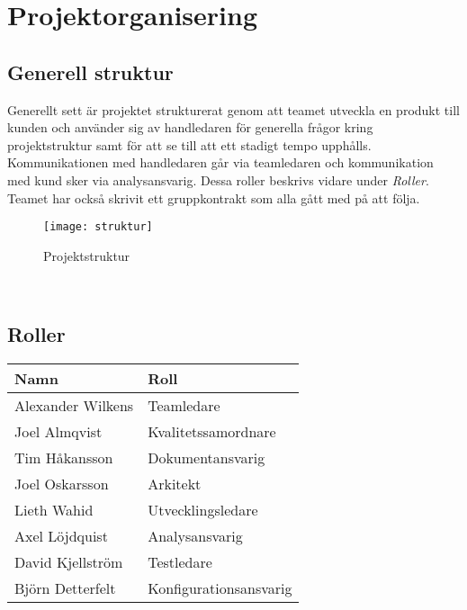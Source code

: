 \section{Projektorganisering}
\subsection{Generell struktur}
Generellt sett är projektet strukturerat genom att teamet utveckla en produkt till kunden och använder sig av
handledaren för generella frågor kring projektstruktur samt för att se till att ett stadigt tempo upphålls.
Kommunikationen med handledaren går via teamledaren och kommunikation med kund sker via analysansvarig. Dessa roller
beskrivs vidare under \textit{Roller}. Teamet har också skrivit ett gruppkontrakt\cite{bib-gruppkontrakt} som alla gått med på att följa.
\begin{figure}[t]
    \centering
    \texttt{[image: struktur]}
    \caption{Projektstruktur}
    \label{fig:struktur}
\end{figure}\\



\subsection{Roller}
\begin{center}
    \begin{tabular}{| l | l |}
        \hline
        \textbf{Namn} & \textbf{Roll} \\
        \hline
        \centering Alexander Wilkens & Teamledare\\
        \hline
        \centering Joel Almqvist & Kvalitetssamordnare\\
        \hline
        \centering Tim Håkansson & Dokumentansvarig\\
        \hline
        \centering Joel Oskarsson & Arkitekt\\
        \hline
        \centering Lieth Wahid & Utvecklingsledare\\
        \hline
        \centering Axel Löjdquist & Analysansvarig\\
        \hline
        \centering David Kjellström & Testledare\\
        \hline
        \centering Björn Detterfelt & Konfigurationsansvarig\\
        \hline
    \end{tabular}
\end{center}
